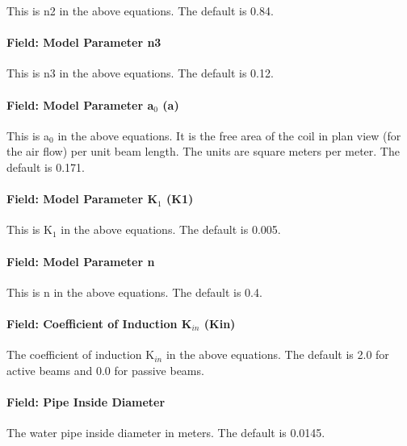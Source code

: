 This is n2 in the above equations. The default is 0.84.

\paragraph{Field: Model Parameter n3}\label{field-model-parameter-n3}

This is n3 in the above equations. The default is 0.12.

\paragraph{Field: Model Parameter a\(_{0}\) (a)}\label{field-model-parameter-aux5f0-a}

This is a\(_{0}\) in the above equations. It is the free area of the coil in plan view (for the air flow) per unit beam length. The units are square meters per meter. The default is 0.171.

\paragraph{Field: Model Parameter K\(_{1}\) (K1)}\label{field-model-parameter-kux5f1-k1}

This is K\(_{1}\) in the above equations. The default is 0.005.

\paragraph{Field: Model Parameter n}\label{field-model-parameter-n}

This is n in the above equations. The default is 0.4.

\paragraph{Field: Coefficient of Induction K\(_{in}\) (Kin)}\label{field-coefficient-of-induction-kux5fin-kin}

The coefficient of induction K\(_{in}\) in the above equations. The default is 2.0 for active beams and 0.0 for passive beams.

\paragraph{Field: Pipe Inside Diameter}\label{field-pipe-inside-diameter}

The water pipe inside diameter in meters. The default is 0.0145.

